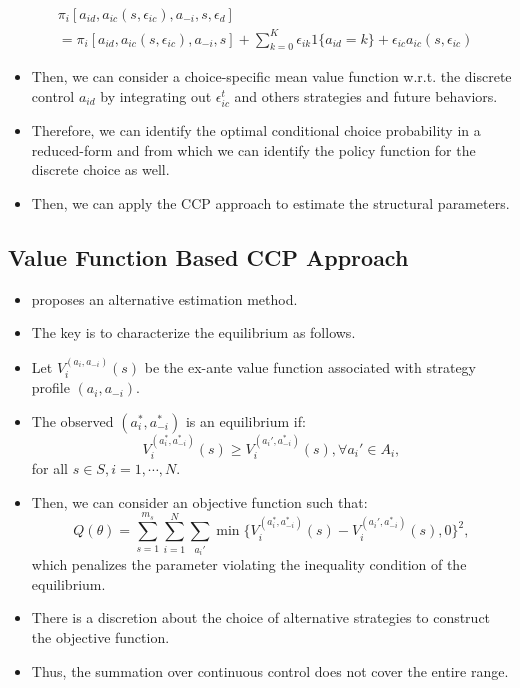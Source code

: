 \documentclass[
]{book}
\providecommand{\tightlist}{%
  \setlength{\itemsep}{0pt}\setlength{\parskip}{0pt}}
\begin{document}
\begin{equation}
\begin{split}
&\pi_i[a_{id}, a_{ic}(s, \epsilon_{ic}), a_{-i}, s, \epsilon_{d}] \\
&= \pi_i[a_{id}, a_{ic}(s, \epsilon_{ic}), a_{-i}, s] +\sum_{k = 0}^K \epsilon_{ik}1\{a_{id} = k\} + \epsilon_{ic} a_{ic}(s, \epsilon_{ic})
\end{split}
\end{equation}

\begin{itemize}
\tightlist
\item
  Then, we can consider a choice-specific mean value function w.r.t.
  the discrete control \(a_{id}\) by integrating out \(\epsilon_{ic}^t\)
  and others strategies and future behaviors.
\item
  Therefore, we can identify the optimal conditional choice
  probability in a reduced-form and from which we can identify the
  policy function for the discrete choice as well.
\item
  Then, we can apply the CCP approach to estimate the structural
  parameters.
\end{itemize}

\hypertarget{value-function-based-ccp-approach}{%
\subsection{Value Function Based CCP Approach}\label{value-function-based-ccp-approach}}

\begin{itemize}
\tightlist
\item
  \citet{bajariEstimatingDynamicModels2007} proposes an alternative
  estimation method.
\item
  The key is to characterize the equilibrium as follows.
\item
  Let \(V_i^{(a_i, a_{-i})}(s)\) be the ex-ante value function
  associated with strategy profile \((a_i, a_{-i})\).
\item
  The observed \((a_i^*, a_{-i}^*)\) is an equilibrium if:
  \begin{equation}
  V_i^{(a_i^*, a_{-i}^*)}(s) \ge V_i^{(a_i', a_{-i}^*)}(s), \forall a_i' \in A_i,
  \end{equation} for all \(s \in S, i = 1, \cdots, N\).
\item
  Then, we can consider an objective function such that:
  \begin{equation}
  Q(\theta) = \sum_{s = 1}^{m_s} \sum_{i = 1}^N \sum_{a_i'} \min\{V_i^{(a_i^*, a_{-i}^*)}(s) - V_i^{(a_i', a_{-i}^*)}(s), 0\}^2,
  \end{equation} which penalizes the parameter violating the
  inequality condition of the equilibrium.
\item
  There is a discretion about the choice of alternative strategies to
  construct the objective function.
\item
  Thus, the summation over continuous control does not cover the
  entire range.
\end{itemize}
\end{document}
